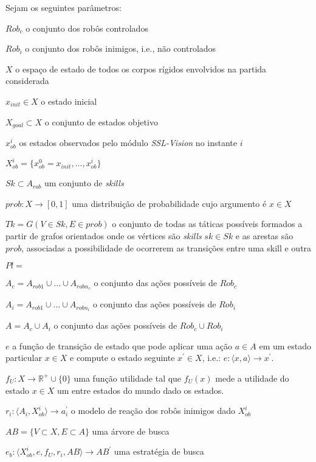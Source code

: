 \begin{defi}[Time]
  Sejam os seguintes parâmetros: 

  \begin{description}
    \item $Rob_c$ o conjunto dos robôs controlados
    \item $Rob_i$ o conjunto dos robôs inimigos, i.e., não controlados
    \item $X$ o espaço de estado de todos os corpos rígidos envolvidos na partida considerada
    \item $x_{init} \in X$ o estado inicial
    \item $X_{goal}\subset X$ o conjunto de estados objetivo
    \item $x_{ob}^{i}$ os estados observados pelo módulo \textit{SSL-Vision} no instante $i$
    \item $X_{ob}^{i} =  \lbrace{x_{ob}^{0} = x_{init},...,x_{ob}^{i}}\rbrace$
    \item $Sk \subset A_{rob}$ um conjunto de \textit{skills}
    \item $prob: X \longrightarrow [0,1]$ uma distribuição de probabilidade cujo argumento é
          $x \in X$
    \item $Tk = G(V \in Sk, E \in {prob} )$ o conjunto de todas as táticas possíveis
          formados a partir de grafos orientados onde os vértices são \textit{skills} $sk \in Sk$
          e as arestas são $prob$, associadas a possibilidade de ocorrerem as transições
          entre uma skill e outra
    \item $Pl = {}$
    \item $A_c = A_{rob 1} \cup ... \cup A_{rob n_c}$ o conjunto das ações possíveis de $Rob_c$
    \item $A_i = A_{rob 1} \cup ... \cup A_{rob n_i}$ o conjunto das ações possíveis de $Rob_i$
    \item $A = A_c \cup A_i$ o conjunto das ações possíveis de $Rob_c \cup Rob_i$
    \item $e$ a função de transição de estado que pode aplicar uma ação $a\in A$ em um estado particular
          $x \in X$ e compute o estado seguinte $x^{'} \in X$, i.e.:
          $e: \langle x,a \rangle \longrightarrow x^{'}$.
    \item $f_{U}: X \longrightarrow \mathbb{R^{+}} \cup\lbrace 0\rbrace$ uma função utilidade tal que
          $f_{U}(x)$ mede a utilidade do estado $x \in X$ um entre estados do mundo dado os estados.
    \item $r_i: \langle A_i, X_{ob}^{i}\rangle \longrightarrow a_i^{'}$ o modelo de reação dos robôs
          inimigos dado $X_{ob}^{i}$
    \item $AB =\lbrace V \subset X, E \subset A\rbrace$ uma árvore de busca
    \item $e_b: \langle X_{ob}^{i}, e, f_{U}, r_i, AB\rangle \longrightarrow AB^{'}$ uma estratégia de busca
    

\end{description}
\end{defi}
